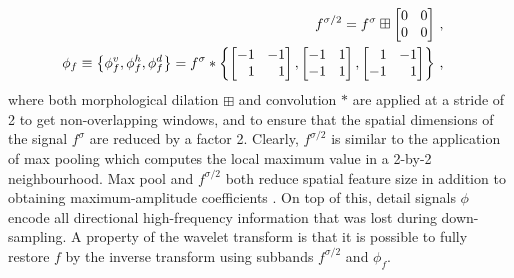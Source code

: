 \documentclass{article}
\begin{document}
\begin{subequations}
\setlength{\arraycolsep}{4.5pt}
    \begin{align}
        \begin{split}
            f^{\sigma/2} &= f^{\sigma} \boxplus \begin{bmatrix*}[r] 0 & 0 \\ 0 & 0 \end{bmatrix*} \,,
        \end{split} \\
        \begin{split}
            \phi_{f} &\equiv \left\{\phi^{v}_{f},\phi^{h}_{f},\phi^{d}_{f}\right\}  = f^{\sigma} *\left\{ \begin{bmatrix*}[r] -1 & -1 \\ 1 & 1 \end{bmatrix*},  \begin{bmatrix*}[r] -1 & 1 \\ -1 & 1 \end{bmatrix*}, \begin{bmatrix*}[r] 1 & -1 \\ -1 & 1 \end{bmatrix*}\right\} \,,
        \end{split}
    \end{align}
\end{subequations}
where both morphological dilation $\boxplus$ and convolution $*$ are applied at a stride of 2 to get non-overlapping windows, and to ensure that the spatial dimensions of the signal $f^{\sigma}$ are reduced by a factor 2.
Clearly, $f^{\sigma/2}$ is similar to the application of max pooling which computes the local maximum value in a 2-by-2 neighbourhood.
Max pool and $f^{\sigma/2}$ both reduce spatial feature size in addition to obtaining maximum-amplitude coefficients \cite{chen2013deep,xie2014spatial}.
On top of this, detail signals $\phi$ encode all directional high-frequency information that was lost during down-sampling.
A property of the wavelet transform is that it is possible to fully restore $f$ by the inverse transform using subbands $f^{\sigma/2}$ and $\phi_f$.
\end{document}
